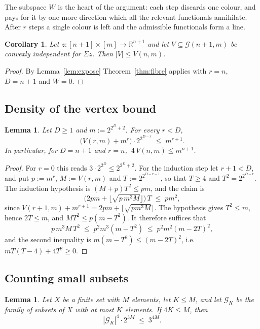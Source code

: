 \documentclass[11pt,a4paper]{article}
\theoremstyle{plain}
\newtheorem{lemma}[theorem]{Lemma}
\newtheorem{corollary}[theorem]{Corollary}
\theoremstyle{definition}
\newcommand{\R}{\mathbb{R}}
\newcommand{\Grid}{\mathcal{G}}
\begin{document}
The subspace $W$ is the heart of the argument: each step discards one colour, and pays for it by
one more direction which all the relevant functionals annihilate. After $r$ steps a single colour
is left and the admissible functionals form a line.

\begin{corollary}\label{cor:vertexbound}
Let $z\colon[n+1]\times[m]\to\R^{n+1}$ and let $V\subseteq\Grid(n+1,m)$ be convexly independent
for $\Sigma z$. Then $|V|\le V(n,m)$.
\end{corollary}

\begin{proof}
By Lemma~\ref{lem:expose} Theorem~\ref{thm:fibre} applies with $r=n$, $D=n+1$ and $W=0$.
\end{proof}

\subsection{Density of the vertex bound}

\begin{lemma}\label{lem:density}
Let $D\ge1$ and $m:=2^{2^{D}+2}$. For every $r<D$,
\[
  \bigl(V(r,m)+m^{r}\bigr)\cdot2^{2^{D-r}}\;\le\;m^{r+1}.
\]
In particular, for $D=n+1$ and $r=n$, $\ 4\,V(n,m)\le m^{n+1}$.
\end{lemma}

\begin{proof}
For $r=0$ this reads $3\cdot2^{2^D}\le2^{2^D+2}$. For the induction step let $r+1<D$, and put
$p:=m^{r}$, $M:=V(r,m)$ and $T:=2^{2^{D-r-1}}$, so that $T\ge4$ and $T^{2}=2^{2^{D-r}}$. The
induction hypothesis is $(M+p)T^{2}\le pm$, and the claim is
\[
  \bigl(2pm+\lfloor\sqrt{p\,m^{3}M}\rfloor\bigr)\,T\;\le\;pm^{2},
\]
since $V(r+1,m)+m^{r+1}=2pm+\lfloor\sqrt{pm^{3}M}\rfloor$. The hypothesis gives $T^{2}\le m$,
hence $2T\le m$, and $MT^{2}\le p(m-T^{2})$. It therefore suffices that
\[
  p\,m^{3}M\,T^{2}\;\le\;p^{2}m^{3}(m-T^{2})\;\le\;p^{2}m^{2}(m-2T)^{2},
\]
and the second inequality is $m(m-T^2)\le(m-2T)^2$, i.e.\ $mT(T-4)+4T^{2}\ge0$.
\end{proof}

\subsection{Counting small subsets}

\begin{lemma}\label{lem:smallcount}
Let $X$ be a finite set with $M$ elements, let $K\le M$, and let $\mathcal{G}_K$ be the family of
subsets of $X$ with at most $K$ elements. If $4K\le M$, then
\[
  |\mathcal{G}_K|^{4}\cdot2^{3M}\;\le\;3^{4M}.
\]
\end{lemma}
\end{document}
